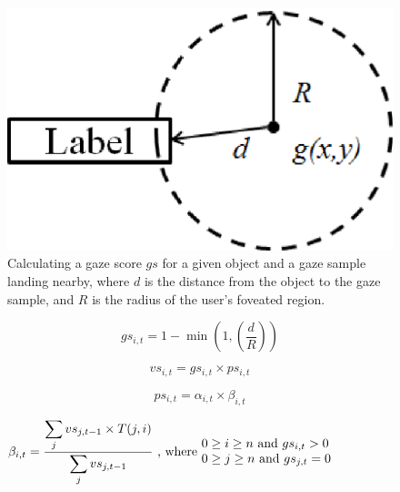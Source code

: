 \begin{figure}[htb]
  \centering
  \includegraphics[width=0.5\linewidth]{images/gazeScoreFig3.eps}
  \caption{Calculating a gaze score $gs$ for a given object and a gaze sample landing nearby, where $d$ is the distance from the object to the gaze sample, and $R$ is the radius of the user's foveated region. }
	\label{fig:gazeScoreFig3}
\end{figure}
\begin{equation}
gs_{i,t} = 1 - \min (1, (\frac{d}{R}))
\label{eq:GS}
\end{equation}

\begin{equation}
vs_{i,t} = gs_{i,t} \times ps_{i,t}
\label{eq:VS}
\end{equation}

\begin{equation}
ps_{i,t} = \alpha_{i,t} \times \beta_{i,t}
\label{eq:ps}
\end{equation}

\begin{equation}
\beta_{i,t} = \frac{\displaystyle\sum_{j} {vs_{j,t-1} \times T(j,i)}}{\displaystyle\sum_{j} vs_{j,t-1}} \text{ , where  } \parbox{15em}{$0\geq i \geq n$ and $gs_{i,t} > 0$\\ $0\geq j \geq n$ and $gs_{j,t} = 0$}
\label{eq:beta}
\end{equation}


